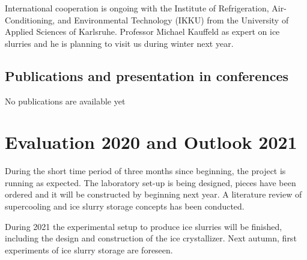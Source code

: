 \documentclass[english]{SFOEYearlyReportEnglish_2018}
\begin{document}
International cooperation is ongoing with the Institute of Refrigeration, Air-Conditioning, and Environmental Technology (IKKU) from the University of Applied Sciences of Karlsruhe. Professor Michael Kauffeld as expert on ice slurries and he is planning to visit us during winter next year.

\subsection{Publications and presentation in conferences}
\label{sec:publications}
No publications are available yet

\section{Evaluation 2020 and Outlook 2021}

During the short time period of three months since beginning, the project is running as expected. 
The laboratory set-up is being designed, pieces have been ordered and it will be constructed by beginning next year. A literature review of supercooling and ice slurry storage concepts has been conducted.

During 2021 the experimental setup to produce ice slurries will be finished, including the design and construction of the ice crystallizer. Next autumn, first experiments of ice slurry storage are foreseen.


%


%

\end{document}
